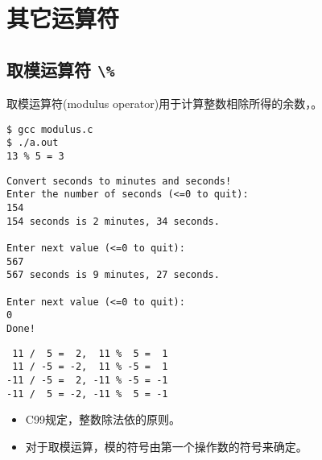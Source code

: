 \section{其它运算符}

\subsection{取模运算符 {\lstinline|\%|}}
\begin{frame}[fragile]\ft{\subsecname}
取模运算符(modulus operator)用于计算整数相除所得的余数，。

\end{frame}

\begin{frame}[fragile]\ft{\subsecname}


\pause
\begin{lstlisting}[backgroundcolor=\color{red!10},frame=no]
$ gcc modulus.c
$ ./a.out  
13 % 5 = 3
\end{lstlisting}
\end{frame}

\begin{frame}\ft{\subsecname}

\end{frame}


\begin{frame}[fragile]\ft{\subsecname}
\begin{lstlisting}[backgroundcolor=\color{red!10},frame=no]
Convert seconds to minutes and seconds!
Enter the number of seconds (<=0 to quit):
154
154 seconds is 2 minutes, 34 seconds.

Enter next value (<=0 to quit):
567
567 seconds is 9 minutes, 27 seconds.

Enter next value (<=0 to quit):
0
Done!
\end{lstlisting}
\end{frame}

\begin{frame}


\end{frame}

\begin{frame}[fragile]
\begin{lstlisting}
 11 /  5 =  2,  11 %  5 =  1
 11 / -5 = -2,  11 % -5 =  1
-11 / -5 =  2, -11 % -5 = -1
-11 /  5 = -2, -11 %  5 = -1
\end{lstlisting}
\pause \vspace{.1in}

\begin{itemize}
\item C99规定，整数除法依的原则。\\[0.2in]
\item 对于取模运算，模的符号由第一个操作数的符号来确定。
\end{itemize}
\end{frame}

